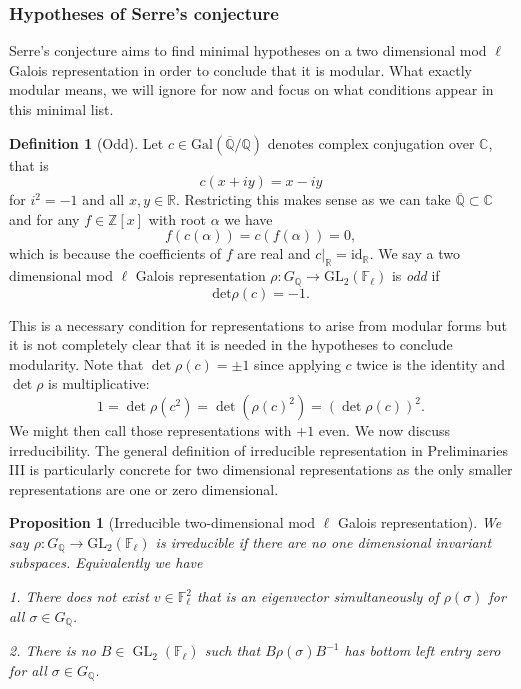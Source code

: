 \documentclass{article}
\newtheorem{proposition}{Proposition}[section]
\theoremstyle{definition}
\newtheorem{definition}{Definition}[section]
\theoremstyle{definition}
\theoremstyle{definition}
\newcommand{\GL}{\operatorname{GL}}
\newcommand{\C}{\mathbb{C}}
\newcommand{\Z}{\mathbb{Z}}
\newcommand{\Q}{\mathbb{Q}}
\newcommand{\F}{\mathbb{F}}
\newcommand{\R}{\mathbb{R}}
\begin{document}
\subsubsection{Hypotheses of Serre's conjecture}
Serre's conjecture aims to find minimal hypotheses on a two dimensional mod $\ell$ Galois representation in order to conclude that it is modular. What exactly modular means, we will ignore for now and focus on what conditions appear in this minimal list.


\begin{definition}[Odd]
   Let $c\in\mathrm{Gal}(\overline{\mathbb{Q}}/\mathbb{Q})$ denotes complex conjugation over $\mathbb{C}$, that is 
   $$c(x+iy)=x-iy$$
   for $i^2=-1$ and all $x,y\in\R$. Restricting this makes sense as we can take $\overline{\Q}\subset\C$ and for any $f\in\Z[x]$ with root $\alpha$ we have 
   $$f(c(\alpha))=c(f(\alpha))=0,$$
which is because the coefficients of $f$ are real and $c|_\R=\mathrm{id}_\R$.
\newline\newline
We say a two dimensional mod $\ell$ Galois representation
\( \rho : G_{\mathbb{Q}} \to \mathrm{GL}_2(\mathbb{F}_\ell) \)
is \emph{odd} if
  $$\text{det}\rho(c)=-1.$$ 

  \end{definition}
  
  This is a necessary condition for representations to arise from modular forms but it is not completely clear that it is needed in the hypotheses to conclude modularity. 
\newline\newline
   Note that $\det\rho(c)=\pm1$ since applying $c$ twice is the identity and $\det\rho$ is multiplicative:
   $$1=\det\rho(c^2)=\det(\rho(c)^2)=(\det\rho(c))^2.$$
We might then call those representations with $+1$ even.
\newline\newline
We now discuss irreducibility. The general definition of irreducible representation in Preliminaries III is particularly concrete for two dimensional representations as the only smaller representations are one or zero dimensional. 
\begin{proposition}[Irreducible two-dimensional mod $\ell$ Galois representation] We say 
   \( \rho : G_{\mathbb{Q}} \to \mathrm{GL}_2(\mathbb{F}_\ell) \)
   is irreducible if there are no one dimensional invariant subspaces. Equivalently we have

1. There does not exist $v\in \F_\ell^2$ that is an eigenvector simultaneously of $\rho(\sigma)$ for all $\sigma\in G_\Q$. 


   2. There is no $B\in \GL_2(\F_\ell)$ such that $B\rho(\sigma)B^{-1}$ has bottom left entry zero for all $\sigma\in G_\Q$.
   
\end{proposition} 
\end{document}
